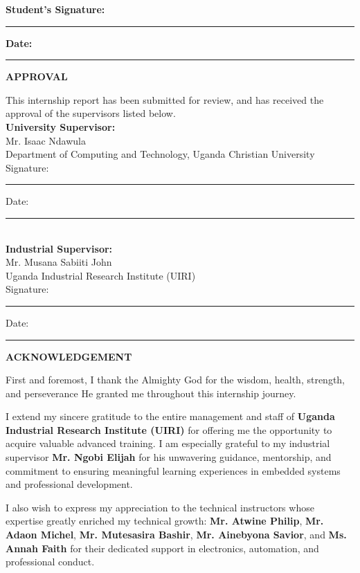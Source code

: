 \documentclass[12pt,a4paper]{report}
\begin{document}
\vspace{1cm}
\noindent \textbf{Student's Signature:} \rule{6cm}{0.2pt} \hfill \textbf{Date:} \rule{3cm}{0.2pt}

\newpage
{\fontsize{14}{16.8}\selectfont\bfseries\centering APPROVAL\par}
\vspace{10pt}
\noindent This internship report has been submitted for review, and has received the approval of the supervisors listed below.\\[1cm]

\noindent \textbf{University Supervisor:} \\
Mr. Isaac Ndawula       \\
Department of Computing and Technology, Uganda Christian University\\[0.5cm]
Signature: \rule{5cm}{0.2pt} \hfill Date: \rule{3cm}{0.2pt}\\[1cm]

\noindent \textbf{Industrial Supervisor:} \\
Mr. Musana Sabiiti John\\
Uganda Industrial Research Institute (UIRI)\\[0.5cm]
Signature: \rule{5cm}{0.2pt} \hfill Date: \rule{3cm}{0.2pt}

\newpage
{\fontsize{14}{16.8}\selectfont\bfseries\centering ACKNOWLEDGEMENT\par}
\vspace{10pt}
\noindent First and foremost, I thank the Almighty God for the wisdom, health, strength, and perseverance He granted me throughout this internship journey.

\noindent I extend my sincere gratitude to the entire management and staff of \textbf{Uganda Industrial Research Institute (UIRI)} for offering me the opportunity to acquire valuable advanced training. I am especially grateful to my industrial supervisor \textbf{Mr. Ngobi Elijah} for his unwavering guidance, mentorship, and commitment to ensuring meaningful learning experiences in embedded systems and professional development.

\noindent I also wish to express my appreciation to the technical instructors whose expertise greatly enriched my technical growth: \textbf{Mr. Atwine Philip}, \textbf{Mr. Adaon Michel}, \textbf{Mr. Mutesasira Bashir}, \textbf{Mr. Ainebyona Savior}, and \textbf{Ms. Annah Faith} for their dedicated support in electronics, automation, and professional conduct.
\end{document}

